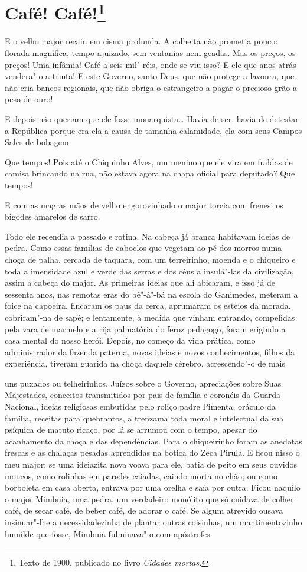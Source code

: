 \chapter{Café! Café!\footnote[*]{Texto de 1900, publicado no livro \emph{Cidades mortas}.}}

E o velho major recaiu em cisma profunda. A colheita não prometia pouco:
florada magnífica, tempo ajuizado, sem ventanias nem geadas. Mas os
preços, os preços! Uma infâmia! Café a seis mil"-réis, onde se viu isso?
E ele que anos atrás vendera"-o a trinta! E este Governo, santo Deus, que
não protege a lavoura, que não cria bancos regionais, que não obriga o
estrangeiro a pagar o precioso grão a peso de ouro!

E depois não queriam que ele fosse monarquista\ldots{} Havia de ser, havia de
detestar a República porque era ela a causa de tamanha calamidade, ela
com seus Campos Sales de bobagem.

Que tempos! Pois até o Chiquinho Alves, um menino que ele vira em
fraldas de camisa brincando na rua, não estava agora na chapa oficial
para deputado? Que tempos!

E com as magras mãos de velho engorovinhado o major torcia com frenesi
os bigodes amarelos de sarro.

Todo ele recendia a passado e rotina. Na cabeça já branca habitavam
ideias de pedra. Como essas famílias de caboclos que vegetam ao pé dos
morros numa choça de palha, cercada de taquara, com um terreirinho,
moenda e o chiqueiro e toda a imensidade azul e verde das serras e dos
céus a insulá"-las da civilização, assim a cabeça do major. As primeiras
ideias que ali abicaram, e isso já de sessenta anos, nas remotas eras do
bê"-á"-bá na escola do Ganimedes, meteram a foice na capoeira, fincaram os
paus da cerca, aprumaram os esteios da morada, cobriram"-na de sapé; e
lentamente, à medida que vinham entrando, compelidas pela vara de
marmelo e a rija palmatória do feroz pedagogo, foram erigindo a casa
mental do nosso herói. Depois, no começo da vida prática, como
administrador da fazenda paterna, novas ideias e novos conhecimentos,
filhos da experiência, tiveram guarida na choça daquele cérebro,
acrescendo"-o de mais

uns puxados ou telheirinhos. Juízos sobre o Governo, apreciações sobre
Suas Majestades, conceitos transmitidos por pais de família e coronéis
da Guarda Nacional, ideias religiosas embutidas pelo roliço padre
Pimenta, oráculo da família, receitas para quebrantos, a trenzama toda
moral e intelectual da sua psíquica de matuto ricaço, por lá se arrumou
com o tempo, apesar do acanhamento da choça e das dependências. Para o
chiqueirinho foram as anedotas frescas e as chalaças pesadas aprendidas
na botica do Zeca Pirula. E ficou nisso o meu major; se uma ideiazita
nova voava para ele, batia de peito em seus ouvidos moucos, como
rolinhas em paredes caiadas, caindo morta no chão; ou como borboleta em
casa aberta, entrava por uma orelha e saía por outra. Ficou naquilo o
major Mimbuia, uma pedra, um verdadeiro monólito que só cuidava de
colher café, de secar café, de beber café, de adorar o café. Se algum
atrevido ousava insinuar"-lhe a necessidadezinha de plantar outras
coisinhas, um mantimentozinho humilde que fosse, Mimbuia fulminava"-o com
apóstrofes.

